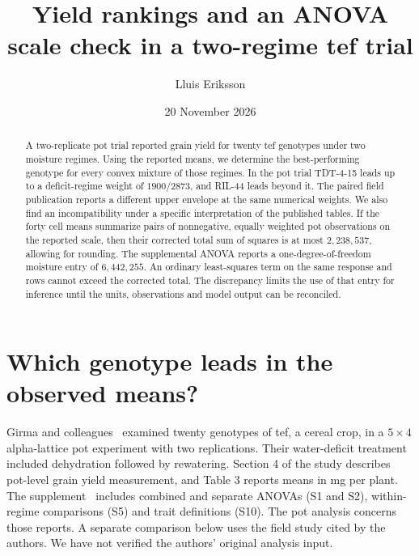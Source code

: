 \documentclass[11pt]{article}
\title{Yield rankings and an ANOVA scale check in a two-regime tef trial}
\author{Lluis Eriksson}
\date{20 November 2026}
\begin{document}
\maketitle
\begin{abstract}
A two-replicate pot trial reported grain yield for twenty tef genotypes under two moisture regimes. Using the reported means, we determine the best-performing genotype for every convex mixture of those regimes. In the pot trial TDT-4-15 leads up to a deficit-regime weight of $1900/2873$, and RIL-44 leads beyond it. The paired field publication reports a different upper envelope at the same numerical weights. We also find an incompatibility under a specific interpretation of the published tables. If the forty cell means summarize pairs of nonnegative, equally weighted pot observations on the reported scale, then their corrected total sum of squares is at most $2{,}238{,}537$, allowing for rounding. The supplemental ANOVA reports a one-degree-of-freedom moisture entry of $6{,}442{,}255$. An ordinary least-squares term on the same response and rows cannot exceed the corrected total. The discrepancy limits the use of that entry for inference until the units, observations and model output can be reconciled.
\end{abstract}
\section{Which genotype leads in the observed means?}
Girma and colleagues~\cite{study} examined twenty genotypes of tef, a cereal crop, in a $5\times4$ alpha-lattice pot experiment with two replications. Their water-deficit treatment included dehydration followed by rewatering. Section 4 of the study describes pot-level grain yield measurement, and Table 3 reports means in mg per plant. The supplement~\cite{sup} includes combined and separate ANOVAs (S1 and S2), within-regime comparisons (S5) and trait definitions (S10). The pot analysis concerns those reports. A separate comparison below uses the field study cited by the authors. We have not verified the authors' original analysis input.
\end{document}
